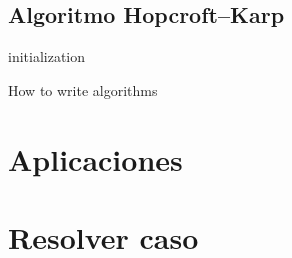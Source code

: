 \documentclass[12pt,a4paper]{article}
\begin{document}
\subsection{Algoritmo Hopcroft–Karp}
\begin{algorithm}[H]
\SetAlgoLined
{}
 initialization\;
 \caption{How to write algorithms}
\end{algorithm}
\section{Aplicaciones} \noindent

\section{Resolver caso} \noindent
\end{document}
